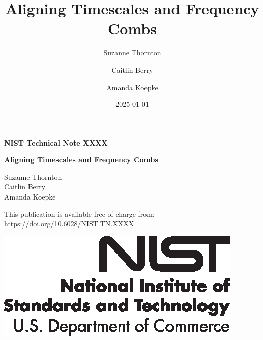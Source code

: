 \documentclass[
  12pt,
]{article}
\title{Aligning Timescales and Frequency Combs}
\author{Suzanne Thornton \and Caitlin Berry \and Amanda Koepke}
\date{2025-01-01}
\begin{document}
\maketitle

\newcommand{\pubnumber}{XXXX}
\newcommand{\DOI}{https://doi.org/10.6028/NIST.TN.XXXX}
\newcommand{\monthyear}{Month Year}


\begin{titlepage}
    \begin{flushright}
 
\LARGE{\textbf{NIST Technical Note XXXX}}\\
\vfill
 
\Huge{\textbf{Aligning Timescales and Frequency Combs}}\\
\vfill
 
\large Suzanne Thornton\\
\large Caitlin Berry\\
\large Amanda Koepke\\
\vfill
 
\normalsize This publication is available free of charge from:\\
https://doi.org/10.6028/NIST.TN.XXXX\\
\vfill
 

\includegraphics[width=0.3\linewidth]{NIST-logo.eps}\\ 


\end{flushright}
\end{titlepage}
\end{document}
